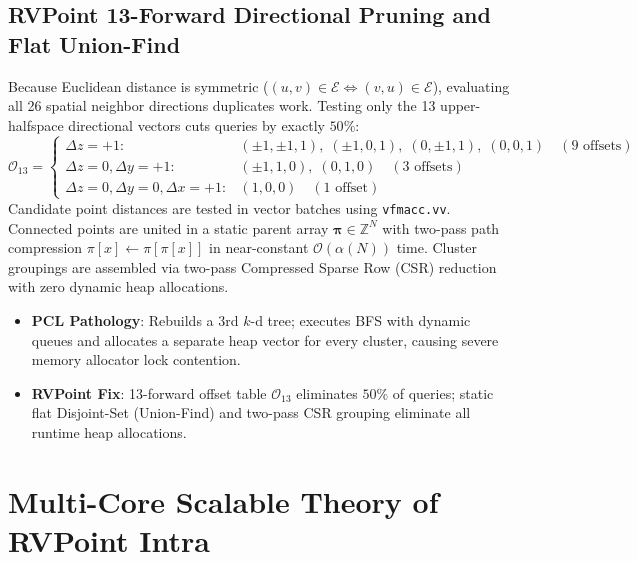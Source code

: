 \documentclass[11pt,a4paper]{article}
\begin{document}
\subsection{RVPoint 13-Forward Directional Pruning and Flat Union-Find}
Because Euclidean distance is symmetric ($(u, v) \in \mathcal{E} \iff (v, u) \in \mathcal{E}$), evaluating all 26 spatial neighbor directions duplicates work. Testing only the 13 upper-halfspace directional vectors cuts queries by exactly $50\%$:
\begin{equation}
\mathcal{O}_{13} = \begin{cases}
\Delta z = +1: & (\pm 1, \pm 1, 1), \; (\pm 1, 0, 1), \; (0, \pm 1, 1), \; (0, 0, 1) \quad (9 \text{ offsets}) \\
\Delta z = 0, \Delta y = +1: & (\pm 1, 1, 0), \; (0, 1, 0) \quad (3 \text{ offsets}) \\
\Delta z = 0, \Delta y = 0, \Delta x = +1: & (1, 0, 0) \quad (1 \text{ offset})
\end{cases}
\label{eq:offset_matrix_math}
\end{equation}
Candidate point distances are tested in vector batches using \texttt{vfmacc.vv}. Connected points are united in a static parent array $\bm{\pi} \in \mathbb{Z}^N$ with two-pass path compression $\pi[x] \leftarrow \pi[\pi[x]]$ in near-constant $\mathcal{O}(\alpha(N))$ time. Cluster groupings are assembled via two-pass Compressed Sparse Row (CSR) reduction with zero dynamic heap allocations.

\begin{tcolorbox}[fixcmp, title={Stage Comparison: Euclidean Clustering}]
\begin{itemize}[leftmargin=1.2em, itemsep=0.1em]
    \item \textbf{PCL Pathology}: Rebuilds a 3rd $k$-d tree; executes BFS with dynamic queues and allocates a separate heap vector for every cluster, causing severe memory allocator lock contention.
    \item \textbf{RVPoint Fix}: 13-forward offset table $\mathcal{O}_{13}$ eliminates $50\%$ of queries; static flat Disjoint-Set (Union-Find) and two-pass CSR grouping eliminate all runtime heap allocations.
\end{itemize}
\end{tcolorbox}

\section{Multi-Core Scalable Theory of RVPoint Intra}
\label{sec:intra_full_math}
\end{document}
